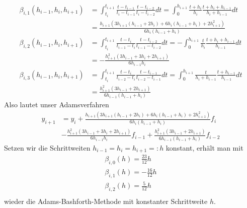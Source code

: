 \begin{solution}
\begin{align*}
  \beta_{i,1}(h_{i-1},h_i,h_{i+1}) &= \int_{t_i}^{t_{i + 1}}
  \frac{t - t_{i - 1}}{t_{i} - t_{i - 1}}\frac{t - t_{i - 2}}{t_{i} - t_{i - 2}}dt
  = \int_{0}^{h_{i+1}}
  \frac{t + h_i}{h_i}\frac{t + h_i + h_{i-1}}{h_i + h_{i-1}}dt \\
  &= \frac{h_{i+1}(3h_{i+1}(h_{i-1} + 2h_i) + 6h_i(h_{i-1} + h_i) + 2h_{i+1}^2)}{6h_i(h_{i-1} + h_i)}\\
  \beta_{i,2}(h_{i-1},h_i,h_{i+1}) &= \int_{t_i}^{t_{i + 1}}
  \frac{t - t_{i}}{t_{i - 1} - t_{i}}\frac{t - t_{i - 2}}{t_{i - 1} - t_{i - 2}}dt
  = -\int_{0}^{h_{i+1}}
  \frac{t}{h_i}\frac{t + h_i + h_{i-1}}{h_{i-1}}dt \\
  &= -\frac{h_{i+1}^2(3h_{i-1} + 3h_i + 2h_{i+1})}{6h_{i-1}h_i} \\
  \beta_{i,3}(h_{i-1},h_i,h_{i+1}) &= \int_{t_i}^{t_{i + 1}}
  \frac{t - t_{i}}{t_{i - 2} - t_{i}}\frac{t - t_{i - 1}}{t_{i-2} - t_{i - 1}}dt
  = \int_{0}^{h_{i+1}}
  \frac{t}{h_i + h_{i-1}}\frac{t + h_{i-1}}{h_{i-1}}dt\\
  &= \frac{h_{i+1}^2(3h_{i-1} + 2h_{i+1})}{6h_{i-1}(h_{i-1} + h_i)}
\end{align*}
Also lautet unser Adamsverfahren
\begin{align*}
  y_{i+1} &= y_i +
  \frac{h_{i+1}(3h_{i+1}(h_{i-1} + 2h_i) + 6h_i(h_{i-1} + h_i) + 2h_{i+1}^2)}{6h_i(h_{i-1} + h_i)}
  f_i \\
  &-\frac{h_{i+1}^2(3h_{i-1} + 3h_i + 2h_{i+1})}{6h_{i-1}h_i}f_{i-1} +
  \frac{h_{i+1}^2(3h_{i-1} + 2h_{i+1})}{6h_{i-1}(h_{i-1} + h_i)}f_{i-2}
\end{align*}
Setzen wir die Schrittweiten $h_{i-1} = h_i = h_{i+1} =: h$ konstant, erhält man mit
\begin{align*}
  \beta_{i,0}(h) = \frac{23}{12}h \\
  \beta_{i,1}(h) = -\frac{16}{12}h \\
  \beta_{i,2}(h) = \frac{5}{12}h \\
\end{align*}
wieder die Adams-Bashforth-Methode mit konstanter Schrittweite $h$.
\end{solution}
